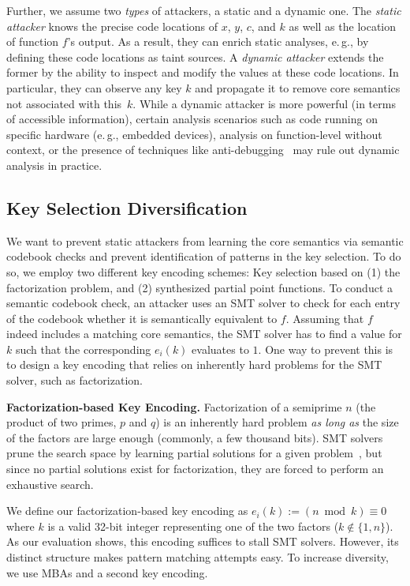 \documentclass[letterpaper,twocolumn,10pt]{article}
\newcommand{\eg}{e.\,g.,\xspace}
\theoremstyle{customexample}
\theoremstyle{customexperiment}
\begin{document}
Further, we assume two \emph{types} of attackers, a static and a dynamic one. The \emph{static attacker} knows the precise code locations of $x$, $y$, $c$, and $k$ as well as the location of function $f$'s output. As a result, they can enrich static analyses, \eg by defining these code locations as taint sources. 
A \emph{dynamic attacker} extends the former by the ability to inspect and modify the values at these code locations. 
In particular, they can observe any key $k$ and propagate it to remove core semantics not associated with this~$k$.
While a dynamic attacker is more powerful (in terms of accessible information), certain analysis scenarios such as code running on specific hardware (\eg embedded devices), analysis on function-level without context, or the presence of techniques like anti-debugging~\cite{antidebugging,antidebugging2} may rule out dynamic analysis in practice.


\subsection{Key Selection Diversification}\label{sec:design:key_selection_diversification}
We want to prevent static attackers from learning the core semantics via semantic codebook checks and prevent identification of patterns in the key selection. To do so, we employ two different key encoding schemes: Key selection based on (1) the factorization problem, and (2) synthesized partial point functions.
To conduct a semantic codebook check, an attacker uses an SMT solver to check for each entry of the codebook whether it is semantically equivalent to $f$.
Assuming that $f$ indeed includes a matching core semantics, the SMT solver has to find a value for $k$ such that the corresponding $e_i(k)$ evaluates to $1$.
One way to prevent this is to design a key encoding that relies on inherently hard problems for the SMT solver, such as factorization.

\textbf{Factorization-based Key Encoding.}
Factorization of a semi\-prime $n$ (the product of two primes, $p$ and $q$) is an inherently hard problem \emph{as long as} the size of the factors are large enough (commonly, a few thousand bits).
SMT solvers prune the search space by learning partial solutions for a given problem~\cite{kroening2008decision}, but since no partial solutions exist for factorization, they are forced to perform an exhaustive search.

We define our factorization-based key encoding as  $e_i(k):=(n\ \operatorname{mod}\ k) \equiv 0$ where $k$ is a valid 32-bit integer representing one of the two factors ($k \not\in \{1,n\}$).
As our evaluation shows, this encoding suffices to stall SMT solvers. 
However, its distinct structure makes pattern matching attempts easy. To increase diversity, we use MBAs and a second key encoding.
\end{document}
